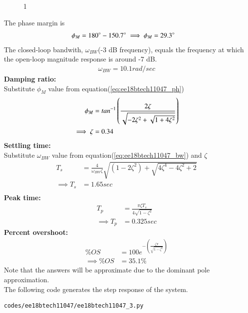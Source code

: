 \begin{enumerate}[label=\thesubsection.\arabic*.,ref=\thesubsection.\theenumi]
\begin{figure}[!ht]
\caption{1}
\label{fig:ee18btech11047_2}
\end{figure}
The phase margin is 
\begin{align}
\phi_{M} &= 180\degree-150.7\degree \implies \phi_{M} = 29.3\degree \label{eq:ee18btech11047_ph}
\end{align}
The closed-loop bandwith, $\omega_{BW}$(-3 dB frequency), equals the frequency at which the open-loop magnitude response is around -7 dB.
\begin{align}
\omega_{BW} = 10.1  rad/sec \label{eq:ee18btech11047_bw}
\end{align}
\textbf{Damping ratio:} \\
Substitute $\phi_{M}$ value from equation(\ref{eq:ee18btech11047_ph})
\begin{align}
\phi_{M} &= {tan}^{-1}\left(\frac{2\zeta}{\sqrt{-2\zeta^{2}+\sqrt{1+4\zeta^{2}}}}\right)\\
\implies \zeta &= 0.34
\end{align}
\textbf{Settling time:} \\
Substitute $\omega_{BW}$ value from equation(\ref{eq:ee18btech11047_bw}) and $\zeta$
\begin{align}
T_{s}&= \frac{4}{\omega_{BW}\zeta}\sqrt{(1-2\zeta^2)+\sqrt{4\zeta^4-4\zeta^2+2}}\\
\implies T_{s} &= 1.65 sec   \\
\end{align}
\textbf{Peak time:}
\begin{align}
T_{p} &= \frac{\pi\zeta T_{s}}{4\sqrt{1-\zeta^2}}\\
\implies T_{p} &= 0.325 sec
\end{align}
\textbf{Percent overshoot:}
\begin{align}
\% OS&=100e^{-(\frac{\zeta\pi}{\sqrt{1-\zeta^2}})}\\
\implies \% OS &= 35.1 \%
\end{align}
Note that the answers will be approximate due to the dominant pole approximation.\\
The following code generates the step response of the system.
\begin{lstlisting}
codes/ee18btech11047/ee18btech11047_3.py
\end{lstlisting}
\begin{figure}[!ht]
\centering

\end{figure}
\end{enumerate}
